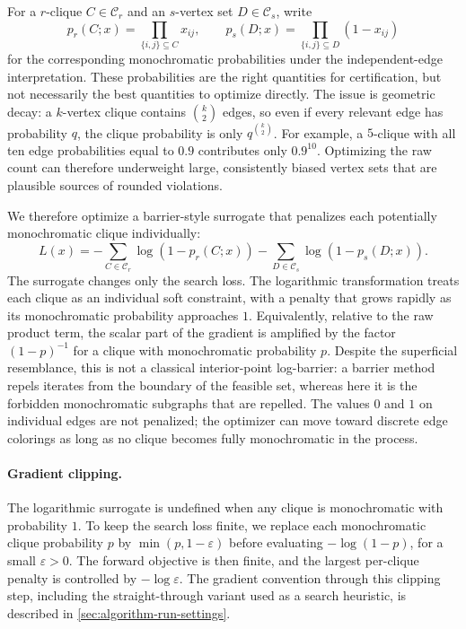 \documentclass{article}
\begin{document}
For a $r$-clique $C \in \mathcal{C}_r$ and an $s$-vertex set $D \in \mathcal{C}_s$, write
\[
    p_r(C;x) = \prod_{\{i,j\} \subseteq C} x_{ij},
    \qquad
    p_s(D;x) = \prod_{\{i,j\} \subseteq D} (1 - x_{ij})
\]
for the corresponding monochromatic probabilities under the independent-edge interpretation. These probabilities are the right quantities for certification, but not necessarily the best quantities to optimize directly. The issue is geometric decay: a $k$-vertex clique contains $\binom{k}{2}$ edges, so even if every relevant edge has probability $q$, the clique probability is only $q^{\binom{k}{2}}$. For example, a $5$-clique with all ten edge probabilities equal to $0.9$ contributes only $0.9^{10}$. Optimizing the raw count can therefore underweight large, consistently biased vertex sets that are plausible sources of rounded violations.

We therefore optimize a barrier-style surrogate that penalizes each potentially monochromatic clique individually:
\begin{equation}\label{eq:log_barrier}
    L(x)
    =
    -\sum_{C \in \mathcal{C}_r} \log\left(1 - p_r(C;x)\right)
    -
    \sum_{D \in \mathcal{C}_s} \log\left(1 - p_s(D;x)\right).
\end{equation}
The surrogate changes only the search loss. The logarithmic transformation treats each clique as an individual soft constraint, with a penalty that grows rapidly as its monochromatic probability approaches $1$. Equivalently, relative to the raw product term, the scalar part of the gradient is amplified by the factor $(1-p)^{-1}$ for a clique with monochromatic probability $p$. Despite the superficial resemblance, this is not a classical interior-point log-barrier: a barrier method repels iterates from the boundary of the feasible set, whereas here it is the forbidden monochromatic subgraphs that are repelled. The values $0$ and $1$ on individual edges are not penalized; the optimizer can move toward discrete edge colorings as long as no clique becomes fully monochromatic in the process.

\paragraph{Gradient clipping.}
The logarithmic surrogate is undefined when any clique is monochromatic with probability $1$. To keep the search loss finite, we replace each monochromatic clique probability $p$ by $\min(p,1-\varepsilon)$ before evaluating $-\log(1-p)$, for a small $\varepsilon>0$. The forward objective is then finite, and the largest per-clique penalty is controlled by $-\log \varepsilon$. The gradient convention through this clipping step, including the straight-through variant used as a search heuristic, is described in \cref{sec:algorithm-run-settings}.
\end{document}
